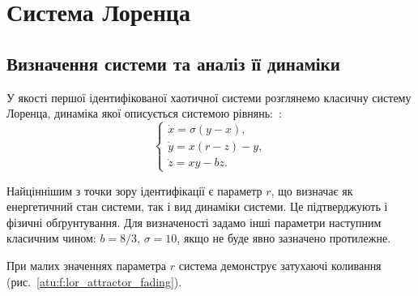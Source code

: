 
\FloatBarrier

\section{Система Лоренца} %
\label{atu:sect:lor}


\subsection{Визначення системи та аналіз її динаміки}%

У якості першої ідентифікованої хаотичної системи розглянемо класичну систему
Лоренца, динаміка якої описується системою
рівнянь:~\cite{moon_chaotic_vibr,anisch_nonlin_eff,chulichkcov_mm_ml_dyn,berje_order_in_chaos}:
%
\begin{equation}
\begin{cases}
  \dot{x} = \sigma (y-x ) , \\
  \dot{y} = x (r-z) - y , \\
  \dot{z} = x y - b z .
\end{cases}
\label{atu:eq:lor}
\end{equation}

Найціннішим з точки зору ідентифікації є параметр $r$, що визначає як
енергетичний стан системи, так і вид динаміки системи. Це підтверджують і
фізичні обґрунтування. Для визначеності задамо інші параметри наступним
класичним чином: $b = 8/3$, $\sigma = 10$, якщо не буде явно
зазначено протилежне.


При малих значеннях параметра $r$ система демонструє затухаючі коливання
(рис.~\ref{atu:f:lor_attractor_fading}).

